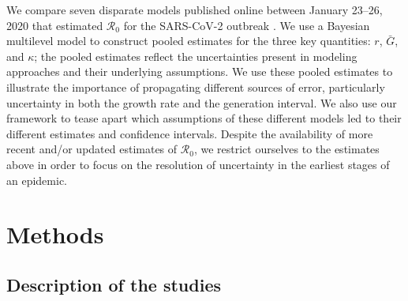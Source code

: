 \documentclass[12pt]{article}
\newcommand{\Ro}{\ensuremath{{\mathcal R}_{0}}\xspace}
\begin{document}
We compare seven disparate models published online between January 23--26, 2020 that estimated \Ro for the SARS-CoV-2 outbreak \citep{bedfordncov, imaincov, liuncov, majumderncov, readncov, riouncov, zhaoncov}. 
We use a Bayesian multilevel model to construct pooled estimates for the three key quantities: $r$, $\bar G$, and $\kappa$;
the pooled estimates reflect the uncertainties present in modeling approaches and their underlying assumptions.
We use these pooled estimates to illustrate the importance of propagating different sources of error, particularly uncertainty in both the growth rate and the generation interval. 
We also use our framework to tease apart which assumptions of these different models led to their different estimates and confidence intervals.
Despite the availability of more recent and/or updated estimates of \Ro, we restrict ourselves to the estimates above in order to focus on the resolution of uncertainty in the earliest stages of an epidemic.

\section{Methods}

\subsection{Description of the studies}
\end{document}
